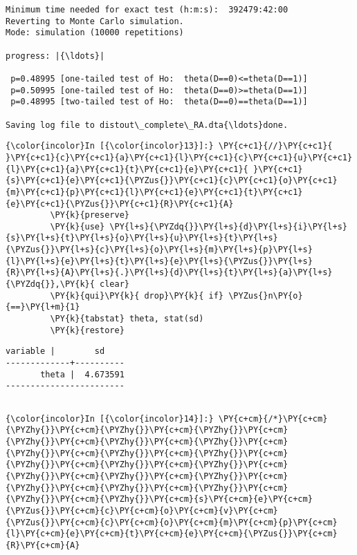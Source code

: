 \documentclass[11pt,notitlepage]{article}\usepackage[]{graphicx}\usepackage[]{color}
\makeatletter
\newenvironment{kframe}{%
 \def\at@end@of@kframe{}%
 \ifinner\ifhmode%
  \def\at@end@of@kframe{\end{minipage}}%
  \begin{minipage}{\columnwidth}%
 \fi\fi%
 \def\FrameCommand##1{\hskip\@totalleftmargin \hskip-\fboxsep
 \colorbox{shadecolor}{##1}\hskip-\fboxsep
     \hskip-\linewidth \hskip-\@totalleftmargin \hskip\columnwidth}%
 \MakeFramed {\advance\hsize-\width
   \@totalleftmargin\z@ \linewidth\hsize
   \@setminipage}}%
 {\par\unskip\endMakeFramed%
 \at@end@of@kframe}
\newenvironment{knitrout}{}{} %
\makeatother
\begin{document}
\begin{enumerate}[a)]
\begin{knitrout}
\begin{kframe}
\begin{Verbatim}[commandchars=\\\{\}]
Minimum time needed for exact test (h:m:s):  392479:42:00
Reverting to Monte Carlo simulation.
Mode: simulation (10000 repetitions)

progress: |{\ldots}|

 p=0.48995 [one-tailed test of Ho:  theta(D==0)<=theta(D==1)]
 p=0.50995 [one-tailed test of Ho:  theta(D==0)>=theta(D==1)]
 p=0.48995 [two-tailed test of Ho:  theta(D==0)==theta(D==1)]

Saving log file to distout\_complete\_RA.dta{\ldots}done.

    \end{Verbatim}

    \begin{Verbatim}[commandchars=\\\{\}]
{\color{incolor}In [{\color{incolor}13}]:} \PY{c+c1}{//}\PY{c+c1}{ }\PY{c+c1}{c}\PY{c+c1}{a}\PY{c+c1}{l}\PY{c+c1}{c}\PY{c+c1}{u}\PY{c+c1}{l}\PY{c+c1}{a}\PY{c+c1}{t}\PY{c+c1}{e}\PY{c+c1}{ }\PY{c+c1}{s}\PY{c+c1}{e}\PY{c+c1}{\PYZus{}}\PY{c+c1}{c}\PY{c+c1}{o}\PY{c+c1}{m}\PY{c+c1}{p}\PY{c+c1}{l}\PY{c+c1}{e}\PY{c+c1}{t}\PY{c+c1}{e}\PY{c+c1}{\PYZus{}}\PY{c+c1}{R}\PY{c+c1}{A}
         \PY{k}{preserve}
         \PY{k}{use} \PY{l+s}{\PYZdq{}}\PY{l+s}{d}\PY{l+s}{i}\PY{l+s}{s}\PY{l+s}{t}\PY{l+s}{o}\PY{l+s}{u}\PY{l+s}{t}\PY{l+s}{\PYZus{}}\PY{l+s}{c}\PY{l+s}{o}\PY{l+s}{m}\PY{l+s}{p}\PY{l+s}{l}\PY{l+s}{e}\PY{l+s}{t}\PY{l+s}{e}\PY{l+s}{\PYZus{}}\PY{l+s}{R}\PY{l+s}{A}\PY{l+s}{.}\PY{l+s}{d}\PY{l+s}{t}\PY{l+s}{a}\PY{l+s}{\PYZdq{}},\PY{k}{ clear}
         \PY{k}{qui}\PY{k}{ drop}\PY{k}{ if} \PYZus{}n\PY{o}{==}\PY{l+m}{1}
         \PY{k}{tabstat} theta, stat(sd)
         \PY{k}{restore}
\end{Verbatim}

    \begin{Verbatim}[commandchars=\\\{\}]
    variable |        sd
-------------+----------
       theta |  4.673591
------------------------


    \end{Verbatim}

    \begin{Verbatim}[commandchars=\\\{\}]
{\color{incolor}In [{\color{incolor}14}]:} \PY{c+cm}{/*}\PY{c+cm}{\PYZhy{}}\PY{c+cm}{\PYZhy{}}\PY{c+cm}{\PYZhy{}}\PY{c+cm}{\PYZhy{}}\PY{c+cm}{\PYZhy{}}\PY{c+cm}{\PYZhy{}}\PY{c+cm}{\PYZhy{}}\PY{c+cm}{\PYZhy{}}\PY{c+cm}{\PYZhy{}}\PY{c+cm}{\PYZhy{}}\PY{c+cm}{\PYZhy{}}\PY{c+cm}{\PYZhy{}}\PY{c+cm}{\PYZhy{}}\PY{c+cm}{\PYZhy{}}\PY{c+cm}{\PYZhy{}}\PY{c+cm}{\PYZhy{}}\PY{c+cm}{\PYZhy{}}\PY{c+cm}{\PYZhy{}}\PY{c+cm}{\PYZhy{}}\PY{c+cm}{\PYZhy{}}\PY{c+cm}{s}\PY{c+cm}{e}\PY{c+cm}{\PYZus{}}\PY{c+cm}{c}\PY{c+cm}{o}\PY{c+cm}{v}\PY{c+cm}{\PYZus{}}\PY{c+cm}{c}\PY{c+cm}{o}\PY{c+cm}{m}\PY{c+cm}{p}\PY{c+cm}{l}\PY{c+cm}{e}\PY{c+cm}{t}\PY{c+cm}{e}\PY{c+cm}{\PYZus{}}\PY{c+cm}{R}\PY{c+cm}{A}
         

\end{Verbatim}
\end{kframe}
\end{knitrout}
\end{enumerate}
\end{document}
